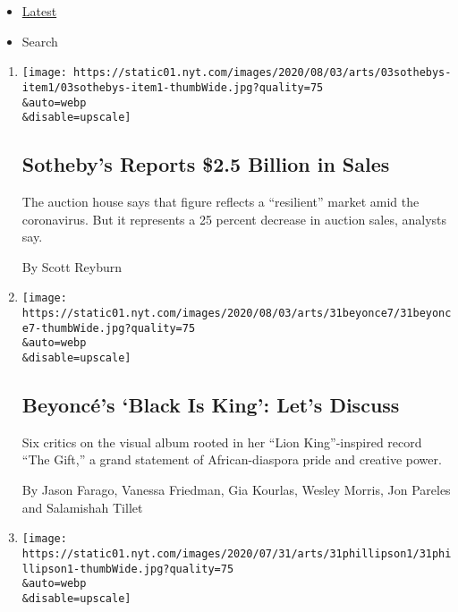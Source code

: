 \begin{itemize}
\tightlist
\item
  \protect\hyperlink{stream-panel}{Latest}
\item
  Search
\end{itemize}

\begin{enumerate}
\def\labelenumi{\arabic{enumi}.}
\item
  \href{/2020/08/03/arts/design/sothebys-sales.html}{}

  \texttt{[image: https://static01.nyt.com/images/2020/08/03/arts/03sothebys-item1/03sothebys-item1-thumbWide.jpg?quality=75\\\&auto=webp\\\&disable=upscale]}

  \hypertarget{sothebys-reports-25-billion-in-sales}{%
  \subsection{Sotheby's Reports \$2.5 Billion in
  Sales}\label{sothebys-reports-25-billion-in-sales}}

  The auction house says that figure reflects a ``resilient'' market
  amid the coronavirus. But it represents a 25 percent decrease in
  auction sales, analysts say.

  By Scott Reyburn
\item
  \href{/2020/07/31/arts/music/beyonce-black-is-king.html}{}

  \texttt{[image: https://static01.nyt.com/images/2020/08/03/arts/31beyonce7/31beyonce7-thumbWide.jpg?quality=75\\\&auto=webp\\\&disable=upscale]}

  \hypertarget{beyoncuxe9s-black-is-king-lets-discuss}{%
  \subsection{Beyoncé's `Black Is King': Let's
  Discuss}\label{beyoncuxe9s-black-is-king-lets-discuss}}

  Six critics on the visual album rooted in her ``Lion King''-inspired
  record ``The Gift,'' a grand statement of African-diaspora pride and
  creative power.

  By Jason Farago, Vanessa Friedman, Gia Kourlas, Wesley Morris, Jon
  Pareles and Salamishah Tillet
\item
  \href{/2020/07/31/arts/design/heather-phillipson-fourth-plinth.html}{}

  \texttt{[image: https://static01.nyt.com/images/2020/07/31/arts/31phillipson1/31phillipson1-thumbWide.jpg?quality=75\\\&auto=webp\\\&disable=upscale]}


\end{enumerate}
